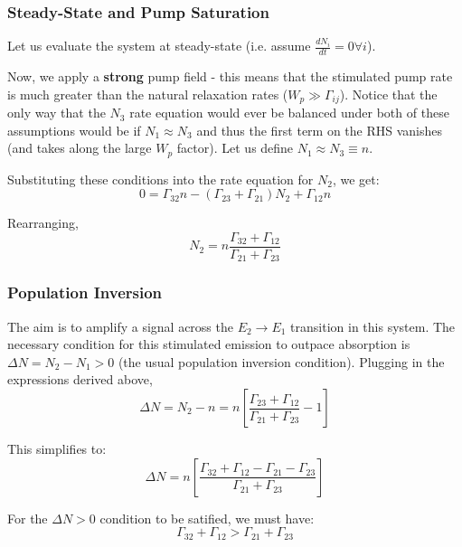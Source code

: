 \documentclass{beamer}
\begin{document}
    \begin{frame}
        \frametitle{Steady-State and Pump Saturation}
        Let us evaluate the system at steady-state (i.e. assume $\frac{dN_{i}}{dt} = 0 \forall i$). 

        Now, we apply a \textbf{strong} pump field - this means that the stimulated pump rate is much greater than the natural relaxation rates ($W_{p}\gg \Gamma_{ij}$). Notice that the only way that the $N_{3}$ rate equation would ever be balanced under both of these assumptions would be if $N_{1} \approx N_{3}$ and thus the first term on the RHS vanishes (and takes along the large $W_{p}$ factor). Let us define $N_{1} \approx N_{3} \equiv n$.

        Substituting these conditions into the rate equation for $N_{2}$, we get:
        $$
        0 = \Gamma_{32}n - (\Gamma_{23}+\Gamma_{21})N_{2} + \Gamma_{12}n
        $$

        Rearranging,
        $$
        N_{2} = n \frac{\Gamma_{32}+\Gamma_{12}}{\Gamma_{21}+\Gamma_{23}}
        $$

    \end{frame}
    
    \begin{frame}
        \frametitle{Population Inversion}
        The aim is to amplify a signal across the $E_{2}\to E_{1}$ transition in this system. The necessary condition for this stimulated emission to outpace absorption is $\Delta N = N_{2}-N_{1} > 0$ (the usual population inversion condition). Plugging in the expressions derived above,
        $$
        \Delta N = N_{2} - n = n\left[ \frac{\Gamma_{23}+\Gamma_{12}}{\Gamma_{21}+\Gamma_{23}} - 1 \right]
        $$
    
        This simplifies to:
        $$
        \Delta N = n\left[ \frac{\Gamma_{32}+\Gamma_{12}-\Gamma_{21}-\Gamma_{23}}{\Gamma_{21}+\Gamma_{23}} \right]
        $$
    
        For the $\Delta N>0$ condition to be satified, we must have:
        $$
        \Gamma_{32}+\Gamma_{12} > \Gamma_{21}+\Gamma_{23}
        $$
    \end{frame}
\end{document}
